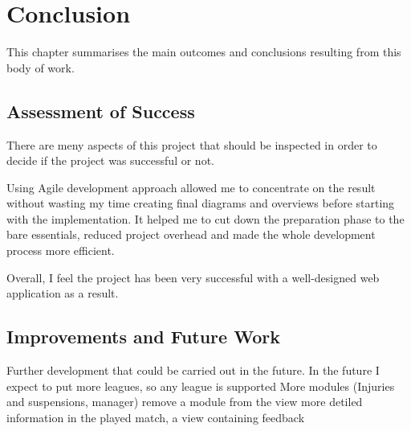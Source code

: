 \chapter{Conclusion}\label{ch:Conclusion}

This chapter summarises the main outcomes and conclusions resulting from this body of work.

\section{Assessment of Success}

There are meny aspects of this project that should be inspected in order to decide if the project was successful or not.

Using Agile development approach allowed me to concentrate on the result without wasting my time creating final diagrams and overviews before starting with the implementation. It helped me to cut down the preparation phase to the bare essentials, reduced project overhead and made the whole development process more efficient.

Overall, I feel the project has been very successful with a well-designed web application as a result.

\section{Improvements and Future Work}

Further development that could be carried out in the future.
In the future I expect to put more leagues, so any league is supported
More modules (Injuries and suspensions, manager)
remove a module from the view
more detiled information in the played match, a view containing feedback
